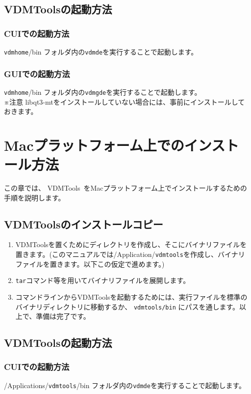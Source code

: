 \documentclass[\pformat,12pt]{jarticle}
\newcommand{\Toolbox}{VDMTools}
\newcommand{\vdmde}{vdmde}
\newcommand{\vdmgde}{vdmgde}
\newcommand{\vdmhome}{vdmhome}
\newcommand{\vdmtools}{vdmtools}
\newcommand{\Toolbox}{VDMTools}
\newcommand{\vdmde}{vppde}
\newcommand{\vdmgde}{vppgde}
\newcommand{\vdmhome}{vpphome}
\newcommand{\vdmtools}{vdmtools}
\newcommand{\Toolbox}{VDMTools}
\newcommand{\vdmde}{vicede}
\newcommand{\vdmgde}{vicegde}
\newcommand{\vdmhome}{vicehome}
\newcommand{\vdmtools}{vdmtools}
\begin{document}
\subsection{VDMToolsの起動方法}
\subsubsection{CUIでの起動方法}
{\tt \vdmhome}/bin フォルダ内の{\tt \vdmde}を実行することで起動します。
\subsubsection{GUIでの起動方法}
{\tt \vdmhome}/bin フォルダ内の{\tt \vdmgde}を実行することで起動します。\\
※注意 libqt3-mtをインストールしていない場合には、事前にインストールしておきます。


\newpage
\section{Macプラットフォーム上でのインストール方法}
この章では、 \Toolbox\ をMacプラットフォーム上でインストールするための手順を説明します。

\subsection{VDMToolsのインストールコピー}\label{purchinstall}
\begin{enumerate}
	\item \Toolbox を置くためにディレクトリを作成し、そこにバイナリファイルを置きます。(このマニュアルでは/Application/{\tt \vdmtools}を作成し、バイナリファイルを置きます。以下この仮定で進めます。)
	\item {\tt tar}コマンド等を用いてバイナリファイルを展開します。
	\item コマンドラインからVDMToolsを起動するためには、実行ファイルを標準のバイナリディレクトリに移動するか、 {\tt \vdmtools/bin} にパスを通します。以上で、準備は完了です。
\end{enumerate}

\subsection{VDMToolsの起動方法}
\subsubsection{CUIでの起動方法}
/Applications/{\tt \vdmtools}/bin フォルダ内の{\tt \vdmde}を実行することで起動します。
\end{document}
